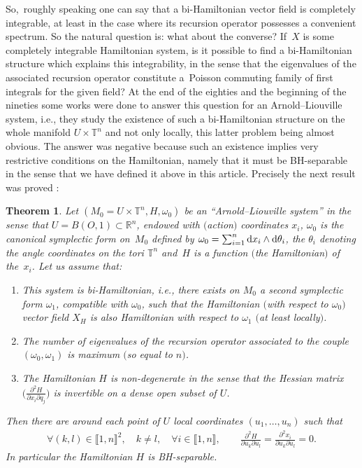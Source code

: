\documentclass[10pt,a4paper]{amsart}
\numberwithin{equation}{section}
\newtheorem{Theorem}{Theorem}[section]
\begin{document}
So,~roughly speaking one can say that a bi-Hamiltonian vector field is completely integrable, at least in the case where its recursion operator possesses a convenient spectrum. So the natural question is: what about the converse? If~$X$ is some completely integrable Hamiltonian system, is it possible to find a bi-Hamiltonian structure which explains this integrability, in the sense that the eigenvalues of the associated recursion operator constitute a~Poisson commuting family of first integrals for the given field? At the end of the eighties and the beginning of the nineties some works \cite{Br, BrMoTu, Fe} were done to answer this question for an Arnold--Liouville system, i.e., they study the existence of such a bi-Hamiltonian structure on the whole manifold $U\times\mathbb{T}^n$ and not only locally, this latter problem being almost obvious. The answer was negative because such an existence implies very restrictive conditions on the Hamiltonian, namely that it must be BH-separable in the sense that we have defined it above in this article.
Precisely the next result was proved \cite{Br, BrMoTu, Fe}:

\begin{Theorem}\label{BHthm}
	Let $(M_0=U\times\mathbb{T}^n,H,\omega_0)$ be an ``Arnold--Liouville system'' in the sense that $U=B(O,1)\subset\mathbb{R}^n$, endowed with $($action$)$ coordinates $x_i$, $\omega_0$ is the canonical symplectic form on~$M_0$ defined by $\omega_0=\sum_{i=1}^n{\rm d}x_i\wedge {\rm d}\theta_i$, the $\theta_i$ denoting the angle coordinates on the tori $\mathbb{T}^n$ and~$H$ is a function $($the Hamiltonian$)$ of the~$x_i$. Let us assume that:
\begin{enumerate}\itemsep=0pt	
	\item[$(i)$] This system is bi-Hamiltonian, i.e., there exists on $M_0$ a second symplectic form $\omega_1$, compatible with $\omega_0$, such that the Hamiltonian $($with respect to $\omega_0)$ vector field $X_H$ is also Hamiltonian with respect to $\omega_1$ $($at least locally$)$.
	
	\item[$(ii)$] The number of eigenvalues of the recursion operator associated to the couple $(\omega_0,\omega_1)$ is maximum $($so equal to $n)$.
	
	\item[$(iii)$] The Hamiltonian $H$ is non-degenerate in the sense that the Hessian matrix $\big(\frac{\partial^2H}{\partial x_i\partial q_j}\big)$ is invertible on a dense open subset of $U$.
\end{enumerate}
	
	Then there are around each point of $U$ local coordinates $(u_1,\dots,u_n)$ such that
\begin{gather*}
\forall (k,l)\in\llbracket 1,n\rrbracket^2,\quad
k\not=l,\quad \forall i\in\llbracket 1,n\rrbracket,\qquad
\frac{\partial^2 H}{\partial u_k\partial u_l}=\frac{\partial^2 x_i}{\partial u_k\partial u_l}=0.
\end{gather*}
	In particular the Hamiltonian $H$ is BH-separable.
\end{Theorem}
\end{document}
